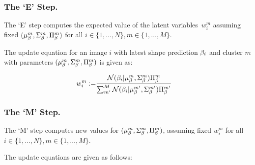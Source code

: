 \subsubsection{The `E' Step.}
The `E' step computes the expected value of the latent variables~$w_{i}^{m}$ 
assuming fixed $(\mu_{\beta}^{m}, \Sigma_{\beta}^{m}, \Pi_{\beta}^{m})$ for all $i \in \{1,\dots,N\}, m \in \{1,\dots,M\}$.

The update equation for an image $i$ with latest shape prediction $\beta_{i}$ 
and cluster $m$ with parameters $(\mu_{\beta}^{m}, \Sigma_{\beta}^{m}, \Pi_{\beta}^{m})$ 
is given as:


\begin{align}
    w_{i}^{m} 
    :=& 
    \frac{
        \mathcal{N}(\beta_{i} | \mu_{\beta}^{m},\Sigma_{\beta}^{m})\Pi_{\beta}^{m}
    }
    {
        \sum_{m'}^{M}
        \mathcal{N}(\beta_{i} | \mu_{\beta}^{m'},\Sigma_{\beta}^{m'})\Pi_{\beta}^{m'}
    }
\end{align}



\subsubsection{The `M' Step.}
The `M' step computes new values for $(\mu_{\beta}^{m}, \Sigma_{\beta}^{m}, \Pi_{\beta}^{m})$, assuming fixed $w_{i}^{m}$ for all $i \in \{1,\dots,N\}, m \in \{1,\dots,M\}$.

The update equations are given as follows:


